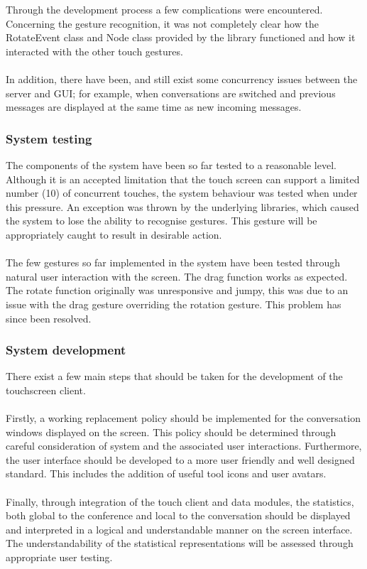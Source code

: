 \documentclass[12p, a4paper, onecolumn]{report}
\begin{document}
Through the development process a few complications were encountered. Concerning the gesture recognition, it was not completely clear how the RotateEvent class and Node class provided by the library functioned and how it interacted with the other touch gestures. \\ \\
In addition, there have been, and still exist some concurrency issues between the server and GUI; for example, when conversations are switched and previous messages are displayed at the same time as new incoming messages.

\subsubsection{System testing}

The components of the system have been so far tested to a reasonable level. 
Although it is an accepted limitation that the touch screen can support a limited number (10) of concurrent touches, the system behaviour was tested when under this pressure. An exception was thrown by the underlying libraries, which caused the system to lose the ability to recognise gestures. This gesture will be appropriately caught to result in desirable action. \\ \\
The few gestures so far implemented in the system have been tested through natural user interaction with the screen. The drag function works as expected. The rotate function originally was unresponsive and jumpy, this was due to an issue with the drag gesture overriding the rotation gesture. This problem has since been resolved.

\subsubsection{System development}

There exist a few main steps that should be taken for the development of the touchscreen client. \\ \\
Firstly, a working replacement policy should be implemented for the conversation windows displayed on the screen. This policy should be determined through careful consideration of system and the associated user interactions. Furthermore, the user interface should be developed to a more user friendly and well designed standard. This includes the addition of useful tool icons and user avatars. \\ \\
Finally, through integration of the touch client and data modules, the statistics, both global to the conference and local to the conversation should be displayed and interpreted in a logical and understandable manner on the screen interface. The understandability of the statistical representations will be assessed through appropriate user testing.
\end{document}
